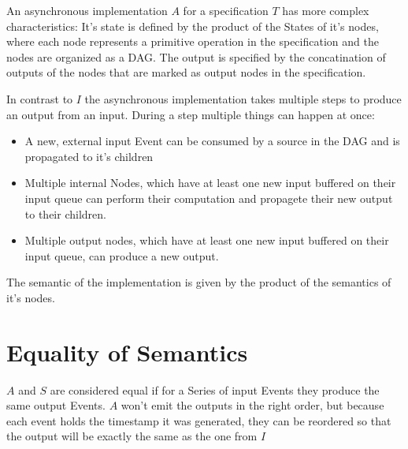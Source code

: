 An asynchronous implementation $A$ for a specification $T$ has more complex characteristics:
It's state is defined by the product of the States of it's nodes, where each node represents a primitive operation in
the specification and the nodes are organized as a DAG.%
The output is specified by the concatination of outputs of the nodes that are marked as output nodes in the specification.

In contrast to $I$ the asynchronous implementation takes multiple steps to produce an output from an input.
During a step multiple things can happen at once:
\begin{itemize}
    \item A new, external input Event can be consumed by a source in the DAG and is propagated to it's children
    \item Multiple internal Nodes, which have at least one new input buffered on their input queue can perform
        their computation and propagete their new output to their children.
    \item Multiple output nodes, which have at least one new input buffered on their input queue, can produce a
        new output.
\end{itemize}

The semantic of the implementation is given by the product of the semantics of it's nodes.

\section{Equality of Semantics}
$A$ and $S$ are considered equal if for a Series of input Events they produce the same output Events.
$A$ won't emit the outputs in the right order, but because each event holds the timestamp it was generated, they can
be reordered so that the output will be exactly the same as the one from $I$

